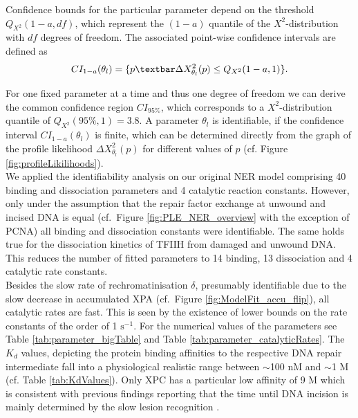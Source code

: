 Confidence bounds for the particular parameter depend on the threshold $Q_{X^2}(1-a,df)$, which represent the $(1-a)$ quantile of the $X^2$-distribution with $df$ degrees of freedom. The associated point-wise confidence intervals are defined as
\begin{equation}
CI_{1-a}(\theta_l)= \{p\textbar \Delta X_{\theta_l}^2(p)\leq Q_{X^2}(1-a,1)\}.
\label{eqn:confidenceIntervals}
\end{equation} 

For one fixed parameter at a time and thus one degree of freedom we can derive the common confidence region $CI_{95\%}$, which corresponds to a $X^2$-distribution quantile of $Q_{X^2}(95\%,1)=3.8$. A parameter $\theta_l$ is identifiable, if the confidence interval $CI_{1-a}(\theta_l)$ is finite, which can be determined directly from the graph of the profile likelihood $\Delta X_{\theta_l}^2(p)$ for different values of $p$ (cf. Figure \ref{fig:profileLikilihoods}).\\ 
We applied the identifiability analysis on our original NER model comprising 40 binding and dissociation parameters and 4 catalytic reaction constants. However, only under the assumption that the repair factor exchange at unwound and incised DNA is equal (cf.\ Figure \ref{fig:PLE_NER_overview} with the exception of PCNA) all binding and dissociation constants were identifiable. The same holds true for the dissociation kinetics of TFIIH from damaged and unwound DNA. This reduces the number of fitted parameters to 14 binding, 13 dissociation and 4 catalytic rate constants.\\ 
Besides the slow rate of rechromatinisation $\delta$, presumably identifiable due to the slow decrease in accumulated XPA (cf.\ Figure \ref{fig:ModelFit_accu_flip}), all catalytic rates are fast. This is seen by the existence of lower bounds on the rate constants of the order of 1 $\text{s}^{-1}$. For the numerical values of the parameters see Table \ref{tab:parameter_bigTable} and Table \ref{tab:parameter_catalyticRates}. The $K_d$ values, depicting the protein binding affinities to the respective DNA repair intermediate fall into a physiological realistic range between $\sim$100 nM and $\sim$1 \textmu M (cf. Table \ref{tab:KdValues}). Only XPC has a particular low affinity of 9 \textmu M which is consistent with previous findings reporting that the time until DNA incision is mainly determined by the slow lesion recognition \cite{Luijsterburg2010}.        

